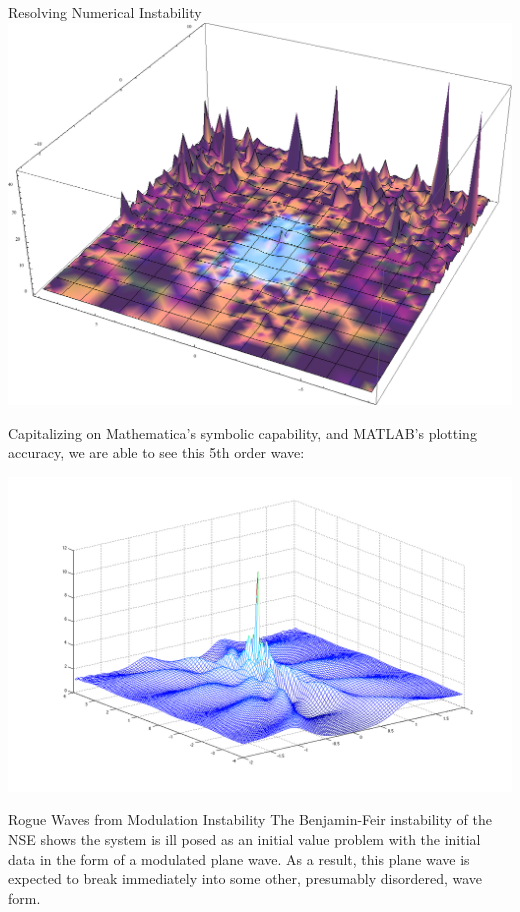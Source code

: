 \documentclass[final]{beamer}
\begin{document}
\begin{frame}{}
\begin{columns}[t]
\begin{column}{.35\linewidth}
\begin{block}{Resolving Numerical Instability}
	\centering \includegraphics[width=600px]{5th_order_unstable.png} \\[1ex]
	
	
		\begin{flushleft} Capitalizing on Mathematica's symbolic capability, and MATLAB's plotting accuracy, we are able to see this 5th order wave: \end{flushleft}
			\centering
\includegraphics[width=670px]{matlab_5th_order_peak.png}
		\\[1ex]
		
		\vspace{-1cm}
		\end{block}
			\hspace{0.25cm}

		\vspace{-.75cm}
		\begin{block}{Rogue Waves from Modulation Instability}
	The Benjamin-Feir instability of the NSE shows the system is ill posed as an initial value problem with the initial data  in the form of a modulated plane wave. As a result, this plane wave is expected to break immediately into some other, presumably disordered, wave form.\\
	

\end{block}
\end{column}
\end{columns}
\end{frame}
\end{document}
